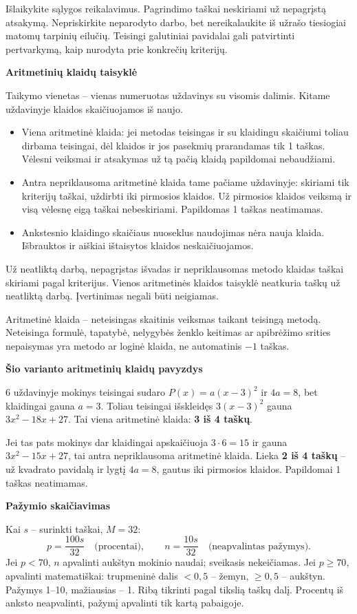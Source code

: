 \documentclass[11pt]{article}
\newcommand{\sk}[1]{\par\medskip\textbf{#1}\par}
\begin{document}
Išlaikykite sąlygos reikalavimus. Pagrindimo taškai neskiriami už nepagrįstą atsakymą. Nepriskirkite neparodyto darbo, bet nereikalaukite iš užrašo tiesiogiai matomų tarpinių eilučių. Teisingi galutiniai pavidalai gali patvirtinti pertvarkymą, kaip nurodyta prie konkrečių kriterijų.
\sk{Aritmetinių klaidų taisyklė}
Taikymo vienetas -- vienas numeruotas uždavinys su visomis dalimis. Kitame uždavinyje klaidos skaičiuojamos iš naujo.
\begin{itemize}
\item Viena aritmetinė klaida: jei metodas teisingas ir su klaidingu skaičiumi toliau dirbama teisingai, dėl klaidos ir jos pasekmių prarandamas tik 1 taškas. Vėlesni veiksmai ir atsakymas už tą pačią klaidą papildomai nebaudžiami.
\item Antra nepriklausoma aritmetinė klaida tame pačiame uždavinyje: skiriami tik kriterijų taškai, uždirbti iki pirmosios klaidos. Už pirmosios klaidos veiksmą ir visą vėlesnę eigą taškai nebeskiriami. Papildomas 1 taškas neatimamas.
\item Ankstesnio klaidingo skaičiaus nuoseklus naudojimas nėra nauja klaida. Išbrauktos ir aiškiai ištaisytos klaidos neskaičiuojamos.
\end{itemize}
Už neatliktą darbą, nepagrįstas išvadas ir nepriklausomas metodo klaidas taškai skiriami pagal kriterijus. Vienos aritmetinės klaidos taisyklė neatkuria taškų už neatliktą darbą. Įvertinimas negali būti neigiamas.

Aritmetinė klaida -- neteisingas skaitinis veiksmas taikant teisingą metodą. Neteisinga formulė, tapatybė, nelygybės ženklo keitimas ar apibrėžimo srities nepaisymas yra metodo ar loginė klaida, ne automatinis $-1$ taškas.

\sk{Šio varianto aritmetinių klaidų pavyzdys}
6 uždavinyje mokinys teisingai sudaro $P(x)=a(x-3)^2$ ir $4a=8$, bet klaidingai gauna $a=3$. Toliau teisingai išskleidęs $3(x-3)^2$ gauna $3 x^{2} - 18 x + 27$. Tai viena aritmetinė klaida: \textbf{3 iš 4 taškų}.

Jei tas pats mokinys dar klaidingai apskaičiuoja $3\cdot6=15$ ir gauna $3 x^{2} - 15 x + 27$, tai antra nepriklausoma aritmetinė klaida. Lieka \textbf{2 iš 4 taškų} -- už kvadrato pavidalą ir lygtį $4a=8$, gautus iki pirmosios klaidos. Papildomai 1 taškas neatimamas.

\sk{Pažymio skaičiavimas}
Kai $s$ -- surinkti taškai, $M=32$:
\[p=\frac{100s}{32}\quad\text{(procentai)},\qquad n=\frac{10s}{32}\quad\text{(neapvalintas pažymys)}.\]
Jei $p<70$, $n$ apvalinti aukštyn mokinio naudai; sveikasis nekeičiamas. Jei $p\ge70$, apvalinti matematiškai: trupmeninė dalis $<0{,}5$ -- žemyn, $\ge0{,}5$ -- aukštyn. Pažymys 1--10, mažiausias -- 1. Ribą tikrinti pagal tikslią taškų dalį. Procentų iš anksto neapvalinti, pažymį apvalinti tik kartą pabaigoje.
\end{document}
